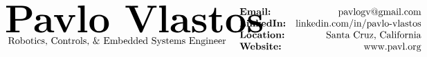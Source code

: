 \documentclass[paper=a4,fontsize=11pt]{article} %
\def \nameColWidth {0.66\textwidth}		%
\def \mainColWidth {0.8\textwidth}		%
\begin{document}
	\setlength{\abovedisplayskip}{0pt}
	\setlength{\belowdisplayskip}{0pt}
	\setlength{\abovedisplayshortskip}{0pt}
	\setlength{\belowdisplayshortskip}{0pt}
\begin{align*}
	&
	\begin{array}{ll}
	\parbox[t]{\nameColWidth}{%
		\text{\fontsize{40}{48}\selectfont \textbf{Pavlo Vlastos}}\\
		\text{\ Robotics, Controls, \& Embedded Systems Engineer}
	}%
	&
	\parbox{\mainColWidth}{%
		$\begin{array}[t]{lr}
		\textbf{Email:} & \text{pavlogv@gmail.com}\\
		\textbf{LinkedIn:} & \text{linkedin.com/in/pavlo-vlastos}\\
		\textbf{Location:} & \text{Santa Cruz, California}\\
		\textbf{Website:} & \text{www.pavl.org}\\
		\end{array}$
	}%
	\end{array}
\end{align*}
\end{document}
